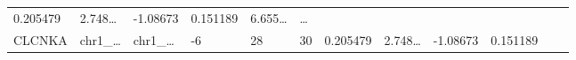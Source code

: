 \documentclass[
]{article}
\begin{document}
\begin{longtable}[]{@{}llllllllllll@{}}
\begin{minipage}[t]{0.06\columnwidth}
0.205479\strut
\end{minipage} & \begin{minipage}[t]{0.08\columnwidth}\raggedright
2.748\ldots{}\strut
\end{minipage} & \begin{minipage}[t]{0.06\columnwidth}\raggedright
-1.08673\strut
\end{minipage} & \begin{minipage}[t]{0.06\columnwidth}\raggedright
0.151189\strut
\end{minipage} & \begin{minipage}[t]{0.09\columnwidth}\raggedright
6.655\ldots{}\strut
\end{minipage} & \begin{minipage}[t]{0.02\columnwidth}\raggedright
\ldots{}\strut
\end{minipage}\tabularnewline
\begin{minipage}[t]{0.06\columnwidth}\raggedright
CLCNKA\strut
\end{minipage} & \begin{minipage}[t]{0.06\columnwidth}\raggedright
chr1\_\ldots{}\strut
\end{minipage} & \begin{minipage}[t]{0.06\columnwidth}\raggedright
chr1\_\ldots{}\strut
\end{minipage} & \begin{minipage}[t]{0.06\columnwidth}\raggedright
-6\strut
\end{minipage} & \begin{minipage}[t]{0.06\columnwidth}\raggedright
28\strut
\end{minipage} & \begin{minipage}[t]{0.06\columnwidth}\raggedright
30\strut
\end{minipage} & \begin{minipage}[t]{0.06\columnwidth}\raggedright
0.205479\strut
\end{minipage} & \begin{minipage}[t]{0.08\columnwidth}\raggedright
2.748\ldots{}\strut
\end{minipage} & \begin{minipage}[t]{0.06\columnwidth}\raggedright
-1.08673\strut
\end{minipage} & \begin{minipage}[t]{0.06\columnwidth}\raggedright
0.151189\strut
\end{minipage} & \begin{minipage}[t]{0.09\columnwidth}\raggedright

\end{minipage}
\end{longtable}
\end{document}
